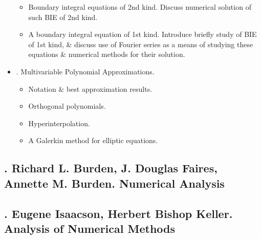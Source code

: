 \documentclass{article}
\begin{document}
\begin{itemize}
\begin{itemize}
		\item {\sf Boundary integral equations of 2nd kind.} Discuss numerical solution of such BIE of 2nd kind.
		\item {\sf A boundary integral equation of 1st kind.} Introduce briefly study of BIE of 1st kind, \& discuss use of Fourier series as a means of studying these equations \& numerical methods for their solution.
	\end{itemize}
	\item {. Multivariable Polynomial Approximations.}
	\begin{itemize}
		\item {\sf Notation \& best approximation results.}
		\item {\sf Orthogonal polynomials.}
		\item {\sf Hyperinterpolation.}
		\item {\sf A Galerkin method for elliptic equations.}
	\end{itemize}
\end{itemize}


\subsection{\cite{Burden_Faires_Burden2015}. {\sc Richard L. Burden, J. Douglas Faires, Annette M. Burden}. Numerical Analysis}


\subsection{\cite{Isaacson_Keller1994}. {\sc Eugene Isaacson, Herbert Bishop Keller}. Analysis of Numerical Methods}
\end{document}
